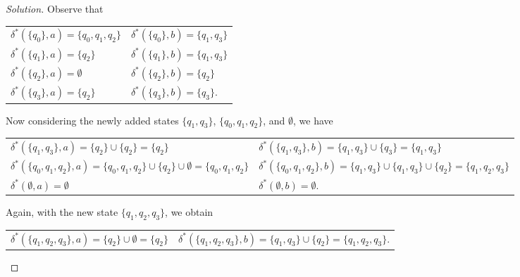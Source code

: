 \documentclass[ 12pt ]{article}
\begin{document}
\begin{enumerate}
		\begin{proof}[Solution]
			Observe that
			\begin{center}
			\begin{tabularx}{0.5\textwidth}{
				>{\raggedright\arraybackslash}X
				>{\raggedright\arraybackslash}X }
				$\delta^* \left( \{ q_0 \}, a \right) = \{ q_0, q_1, q_2 \}$ & $\delta^* \left( \{ q_0 \}, b \right) = \{ q_1, q_3 \}$ \\
				$\delta^* \left( \{ q_1 \}, a \right) = \{ q_2 \}$ & $\delta^* \left( \{ q_1 \}, b \right) = \{ q_1, q_3 \}$ \\
				$\delta^* \left( \{ q_2 \}, a \right) = \emptyset$ & $\delta^* \left( \{ q_2 \}, b \right) = \{ q_2 \}$ \\
				$\delta^* \left( \{ q_3 \}, a \right) = \{ q_2 \}$ & $\delta^* \left( \{ q_3 \}, b \right) = \{ q_3 \}$.
			\end{tabularx}
			\end{center}
			Now considering the newly added states $\{ q_1, q_3 \}$, $\{ q_0, q_1, q_2 \}$, and $\emptyset$, we have
			\begin{center}
			\begin{tabularx}{1\textwidth}{
				>{\raggedright\arraybackslash}X
				>{\raggedright\arraybackslash}X }
				$\delta^* \left( \{ q_1, q_3 \}, a \right) = \{ q_2 \} \cup \{ q_2 \} = \{ q_2 \}$ & $\delta^* \left( \{ q_1, q_3 \}, b \right) = \{ q_1, q_3 \} \cup \{ q_3 \} = \{ q_1, q_3 \}$ \\
				$\delta^* \left( \{ q_0, q_1, q_2 \}, a \right) = \{ q_0, q_1, q_2 \} \cup \{ q_2 \} \cup \emptyset = \{ q_0, q_1, q_2 \}$ & $\delta^* \left( \{ q_0, q_1, q_2 \}, b \right) = \{ q_1, q_3 \} \cup \{ q_1, q_3 \} \cup \{ q_2 \} = \{ q_1, q_2, q_3 \}$ \\
				$\delta^* \left( \emptyset, a \right) = \emptyset$ & $\delta^* \left( \emptyset, b \right) = \emptyset$.
			\end{tabularx}
			\end{center}
			Again, with the new state $\{ q_1, q_2, q_3 \}$, we obtain
			\begin{center}
			\begin{tabularx}{1\textwidth}{
				>{\raggedright\arraybackslash}X
				>{\raggedright\arraybackslash}X }
				$\delta^* \left( \{ q_1, q_2, q_3 \}, a \right) = \{ q_2 \} \cup \emptyset = \{ q_2 \}$ & $\delta^* \left( \{ q_1, q_2, q_3 \}, b \right) = \{ q_1, q_3 \} \cup \{ q_2\} = \{ q_1, q_2, q_3 \}$.
			\end{tabularx}
			\end{center}

\end{proof}
\end{enumerate}
\end{document}

